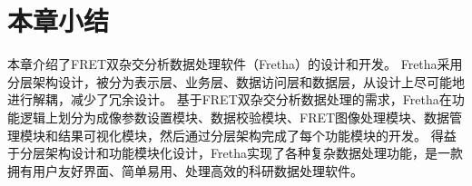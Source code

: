 \section{本章小结}

\ifshowtext
本章介绍了FRET双杂交分析数据处理软件（Fretha）的设计和开发。
Fretha采用分层架构设计，被分为表示层、业务层、数据访问层和数据层，从设计上尽可能地进行解耦，减少了冗余设计。
基于FRET双杂交分析数据处理的需求，Fretha在功能逻辑上划分为成像参数设置模块、数据校验模块、FRET图像处理模块、数据管理模块和结果可视化模块，然后通过分层架构完成了每个功能模块的开发。
得益于分层架构设计和功能模块化设计，Fretha实现了各种复杂数据处理功能，是一款拥有用户友好界面、简单易用、处理高效的科研数据处理软件。
\fi